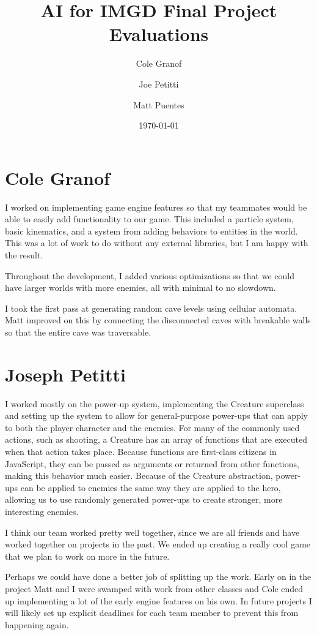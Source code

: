 \documentclass[a4paper, 12pt]{article}
\title{AI for IMGD Final Project Evaluations}
\author{Cole Granof \and Joe Petitti \and Matt Puentes}
\date{\today}
\begin{document}
\maketitle

\section{Cole Granof}

I worked on implementing game engine features so that my teammates would be able
to easily add functionality to our game. This included a particle system, basic
kinematics, and a system from adding behaviors to entities in the world. This
was a lot of work to do without any external libraries, but I am happy with the
result.

Throughout the development, I added various optimizations so that we could have
larger worlds with more enemies, all with minimal to no slowdown.

I took the first pass at generating random cave levels using cellular automata.
Matt improved on this by connecting the disconnected caves with breakable walls
so that the entire cave was traversable.

\section{Joseph Petitti}

I worked mostly on the power-up system, implementing the Creature superclass and
setting up the system to allow for general-purpose power-ups that can apply to
both the player character and the enemies. For many of the commonly used
actions, such as shooting, a Creature has an array of functions that are
executed when that action takes place. Because functions are first-class
citizens in JavaScript, they can be passed as arguments or returned from
other functions, making this behavior much easier. Because of the Creature
abstraction, power-ups can be applied to enemies the same way they are applied
to the hero, allowing us to use randomly generated power-ups to create stronger,
more interesting enemies.

I think our team worked pretty well together, since we are all friends and have
worked together on projects in the past. We ended up creating a really cool game
that we plan to work on more in the future.

Perhaps we could have done a better job of splitting up the work. Early on in
the project Matt and I were swamped with work from other classes and Cole ended
up implementing a lot of the early engine features on his own. In future
projects I will likely set up explicit deadlines for each team member to prevent
this from happening again.
\end{document}
